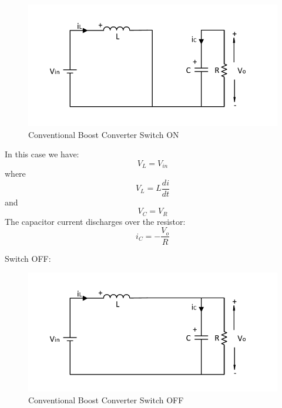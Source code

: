 \begin{figure}[H]
   \centering
   \includegraphics[width=\textwidth]{figures/aConventionalBoost/ConventionalBoostConverterON.pdf}
    \caption{Conventional Boost Converter Switch ON}
	\label{fig:ConventionalBoostON}
\end{figure}

In this case we have:
\begin{equation}
	V_L = V_{in}
	\label{eq:CBC_SWON1}
\end{equation}
where
\begin{equation}
	V_L = L \frac{di}{dt}
	\label{eq:CBC_SWON2}
\end{equation}
and
\begin{equation}
	V_C = V_R
	\label{eq:CBC_SWON3}
\end{equation}
The capacitor current discharges over the resistor:
\begin{equation}
	i_C = -\frac{V_o}{R}
	\label{eq:CBC_SWON4}
\end{equation}


Switch OFF:

\begin{figure}[H]
   \centering
   \includegraphics[width=\textwidth]{figures/aConventionalBoost/ConventionalBoostConverterOFF.pdf}
    \caption{Conventional Boost Converter Switch OFF}
	\label{fig:ConventionalBoostOFF}
\end{figure}

